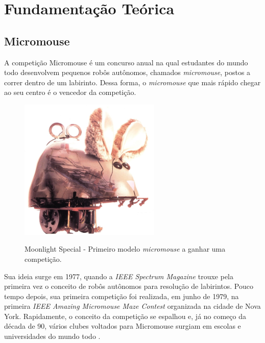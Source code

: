 \chapter{Fundamentação Teórica}
\label{chap:fundteor}

\section{Micromouse}
\label{sec:Micromouse}
\hspace{0.5cm} A competição Micromouse é um concurso anual na qual estudantes do mundo todo desenvolvem pequenos robôs autônomos, chamados \textit{micromouse}, postos a correr dentro de um labirinto. Dessa forma, o \textit{micromouse} que mais rápido chegar ao seu centro é o vencedor da competição.

\begin{figure}[H]
	\centering
	\caption{Moonlight Special - Primeiro modelo \textit{micromouse} a ganhar uma competição.}
	\includegraphics[width=0.6\textwidth]
	{Figures/MoonlightSpecial.jpg}
	\label{fig:MoonlightSpecial}
\end{figure}

\hspace{0.5cm} Sua ideia surge em 1977, quando a \textit{IEEE Spectrum Magazine} trouxe pela primeira vez o conceito de robôs autônomos para resolução de labirintos. Pouco tempo depois, sua primeira competição foi realizada, em junho de 1979, na primeira \textit{IEEE Amazing Micromouse Maze Contest} organizada na cidade de Nova York. Rapidamente, o conceito da competição se espalhou e, já no começo da década de 90, vários clubes voltados para Micromouse surgiam em escolas e universidades do mundo todo \cite{Tondr2004}.

